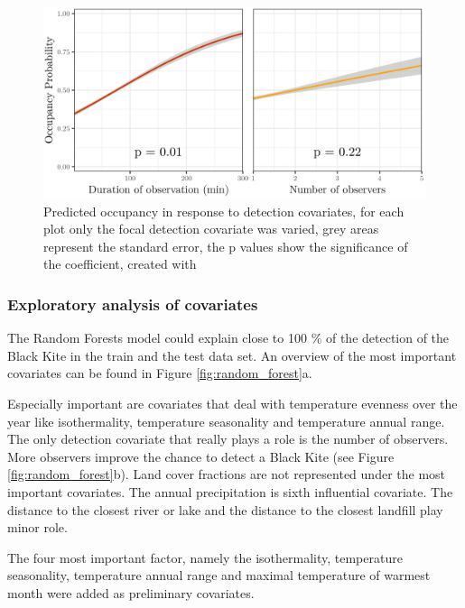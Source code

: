 \begin{multicols}{2}
\begin{figure}[t]
	\centering
	\includegraphics[width=0.8\linewidth]{img/det_covariates}
	\caption{Predicted occupancy in response to detection covariates, for each plot only the focal detection covariate was varied, grey areas represent the standard error, the p values show the significance of the coefficient, created with \textcite{ggplot2}}
	\label{fig:det}
\end{figure}


\subsubsection*{Exploratory analysis of covariates}
The Random Forests model could explain close to 100 \% of the detection of the Black Kite in the train and the test data set. An overview of the most important covariates can be found in Figure \ref{fig:random_forest}a. 

Especially important are covariates that deal with temperature evenness over the year like isothermality, temperature seasonality and temperature annual range. The only detection covariate that really plays a role is the number of observers. More observers improve the chance to detect a Black Kite (see Figure \ref{fig:random_forest}b). Land cover fractions are not represented under the most important covariates. The annual precipitation is sixth influential covariate. The distance to the closest river or lake and the distance to the closest landfill play minor role.

The four most important factor, namely the isothermality, temperature seasonality, temperature annual range and maximal temperature of warmest month were added as preliminary covariates.   


\end{multicols}
